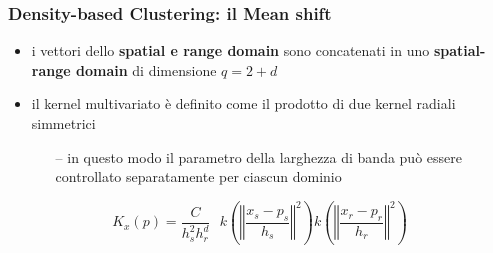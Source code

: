\begin{frame}

	\frametitle{{\color{GradientDescentDiagramRed}Density-based Clustering}: il Mean shift}


		\begin{itemize}
			\item i vettori dello \textbf{spatial e range domain} sono concatenati in uno \textbf{spatial-range domain} di dimensione $q = 2 + d$
			\item il kernel multivariato è definito come il prodotto di due kernel radiali simmetrici		\begin{itemize}
					\item[--] in questo modo il parametro della larghezza di banda può essere controllato separatamente per ciascun dominio
				\end{itemize}
		\end{itemize}

		$$K_x(p) = \frac{C}{h_s^2 h_r^d} \text{ } k\left( {\left\Vert \frac{x_s - p_s}{h_s} \right\Vert}^2 \right) k\left( {\left\Vert \frac{x_r - p_r}{h_r} \right\Vert}^2 \right)$$

\end{frame}


